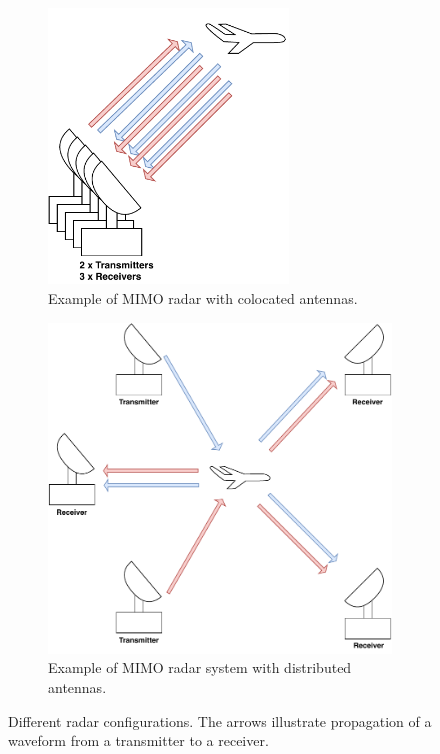 \documentclass[english, 12pt, a4paper, elec, utf8, a-1b, online]{aaltothesis}
\begin{document}
\begin{figure}[htb]
\begin{subfigure}[b]{0.45\textwidth}
        \includegraphics[width=0.7\textwidth]{figures/background/radar_types_colocated_MIMO.pdf}
        \caption{Example of MIMO radar with colocated antennas.}
        \label{fig:colocated_MIMO_radar}
    \end{subfigure}
    \hfill
    \begin{subfigure}[b]{0.45\textwidth}
        \includegraphics[width=\textwidth]{figures/background/radar_types_distributed_MIMO.pdf}
        \caption{Example of MIMO radar system with distributed antennas.}
        \label{fig:distributed_MIMO_radar}
    \end{subfigure}
    \caption{Different radar configurations. The arrows illustrate propagation of a waveform from a transmitter to a receiver.}
    \label{fig:radar_types}
\end{figure}
\end{document}
